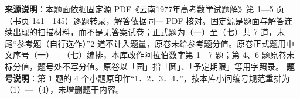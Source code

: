 


\begin{gktip}
\textbf{来源说明}：本题面依据固定源 PDF《云南1977年高考数学试题解》第 1—5 页（书页 141—145）逐题转录，解答依据同一 PDF 核对。固定源是题面与解答连续出现的扫描材料，而不是无答案试卷；正式题为（一）至（七）共 7 道，末尾“参考题（自行选作）”2 道不计入题量，原卷未给参考题分值。原卷正式题用中文序号（一）—（七）编排，本库改作阿拉伯数字第 1—7 题；第 4、6 题原卷未标分值，题号处不写分值。原卷以「园」指「圆」、「予定期限」等用字照录。
\textbf{题号说明}：第 1 题的 4 个小题原印作“1．2．3．4．”，按本库小问编号规范重排为（1）—（4），未增删题干内容。
\end{gktip}

